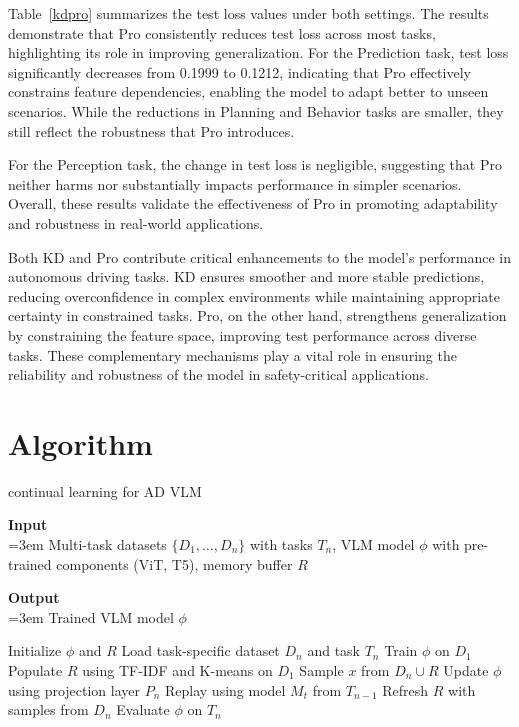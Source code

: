 Table~\ref{kdpro} summarizes the test loss values under both settings. The results demonstrate that Pro consistently reduces test loss across most tasks, highlighting its role in improving generalization. For the Prediction task, test loss significantly decreases from 0.1999 to 0.1212, indicating that Pro effectively constrains feature dependencies, enabling the model to adapt better to unseen scenarios. While the reductions in Planning and Behavior tasks are smaller, they still reflect the robustness that Pro introduces. 

For the Perception task, the change in test loss is negligible, suggesting that Pro neither harms nor substantially impacts performance in simpler scenarios. Overall, these results validate the effectiveness of Pro in promoting adaptability and robustness in real-world applications.

Both KD and Pro contribute critical enhancements to the model's performance in autonomous driving tasks. KD ensures smoother and more stable predictions, reducing overconfidence in complex environments while maintaining appropriate certainty in constrained tasks. Pro, on the other hand, strengthens generalization by constraining the feature space, improving test performance across diverse tasks. These complementary mechanisms play a vital role in ensuring the reliability and robustness of the model in safety-critical applications.









\section{Algorithm}
\begin{algorithm}
\caption{continual learning for AD VLM}


\textbf{Input}\\
\noindent \hangindent=3em 
Multi-task datasets \(\{D_1, \ldots, D_n\}\) with tasks \(T_n\), VLM model \(\phi\) with pre-trained components (ViT, T5), memory buffer \(R\)

\textbf{Output}\\
\noindent \hangindent=3em 
Trained VLM model \(\phi\) 

\begin{algorithmic}[1]
\STATE Initialize \(\phi\) and \(R\)
    \STATE Load task-specific dataset \(D_n\) and task \(T_n\)
        \STATE Train \(\phi\) on \(D_1\)
        \STATE Populate \(R\) using TF-IDF and K-means on \(D_1\)
    \ELSE
            \STATE Sample \(x\) from \(D_n \cup R\)
                \STATE Update \(\phi\) using projection layer \(P_n\)
            \ELSE
                \STATE Replay using model \(M_t\) from \(T_{n-1}\)
            \ENDIF
        \ENDFOR
        \STATE Refresh \(R\) with samples from \(D_n\)
    \ENDIF
    \STATE Evaluate \(\phi\) on \(T_n\)
\ENDFOR
\end{algorithmic}
\end{algorithm}

